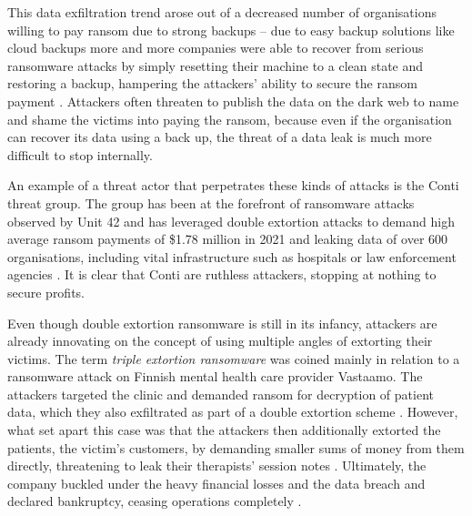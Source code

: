 This data exfiltration trend arose out of a decreased number of organisations willing to pay ransom due to strong
backups -- due to easy backup solutions like cloud backups more and more companies were able to recover from serious
ransomware attacks by simply resetting their machine to a clean state and restoring a backup, hampering the attackers'
ability to secure the ransom payment \cite{multiple-extortion-ransomware}. Attackers often threaten to publish
the data on the dark web to name and shame the victims into paying the ransom, because even if the 
organisation can recover its data using a back up, the threat of a data leak is much more difficult to stop internally.

An example of a threat actor that perpetrates these kinds of attacks is the Conti threat group. 
The group has been at the forefront of ransomware attacks observed by Unit 42 and has leveraged double extortion
attacks to demand high average ransom payments of \$1.78 million in 2021 and leaking data of over 600 organisations,
including vital infrastructure such as hospitals or law enforcement agencies \cite{unit42-ransomware}.
It is clear that Conti are ruthless attackers, stopping at nothing to secure profits.

Even though double extortion ransomware is still in its infancy, attackers are already innovating on the concept
of using multiple angles of extorting their victims. The term \emph{triple extortion ransomware} was coined mainly
in relation to a ransomware attack on Finnish mental health care provider Vastaamo. The attackers targeted the clinic 
and demanded ransom for decryption of patient data, which they also exfiltrated as part of a double extortion scheme
\cite{kshteri-ransomware}.
However, what set apart this case was that the attackers then additionally extorted the patients, the victim's
customers, by demanding smaller sums of money from them directly, threatening to leak their therapists' 
session notes \cite{vastaamo}.
Ultimately, the company buckled under the heavy financial losses and the data breach and declared bankruptcy,
ceasing operations completely \cite{vastaamo, kshteri-ransomware}.

